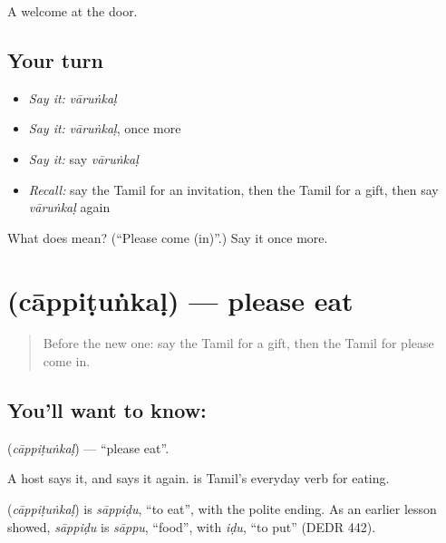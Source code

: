 \begin{grammarlens}[title={What you've built}]
A welcome at the door.
\end{grammarlens}

\subsection*{Your turn}
\begin{itemize}
\raggedright
  \item \emph{Say it:} \emph{vāruṅkaḷ}
  \item \emph{Say it:} \emph{vāruṅkaḷ}, once more
  \item \emph{Say it:} say \emph{vāruṅkaḷ}
  \item \emph{Recall:} say the Tamil for an invitation, then the Tamil for a gift, then say \emph{vāruṅkaḷ} again
\end{itemize}

\begin{tcolorbox}[breakable,colback=teal!4,colframe=teal!35!black,title={Before you move on}]
What does  mean? (\textquotedblleft{}Please come (in)\textquotedblright{}.) Say it once more.
\end{tcolorbox}
\section[\texorpdfstring{\ta{சாப்பிடுங்கள்} (cāppiṭuṅkaḷ)}{சாப்பிடுங்கள் (cāppiṭuṅkaḷ)}]{ (cāppiṭuṅkaḷ) — please eat}

\label{lesson:TA-C98-eat}



\begin{quote}
Before the new one: say the Tamil for a gift, then the Tamil for please come in.
\end{quote}

\subsection*{You'll want to know: }
\textbf{} (\emph{cāppiṭuṅkaḷ}) — \textquotedblleft{}please eat\textquotedblright{}.

A host says it, and says it again. \textbf{} is Tamil's everyday verb for eating.

\begin{cousinweb}
\textbf{} (\emph{cāppiṭuṅkaḷ}) is \emph{sāppiḍu}, \textquotedblleft{}to eat\textquotedblright{}, with the polite ending. As an earlier lesson showed, \emph{sāppiḍu} is \emph{sāppu}, \textquotedblleft{}food\textquotedblright{}, with \emph{iḍu}, \textquotedblleft{}to put\textquotedblright{} (DEDR 442).
\end{cousinweb}

